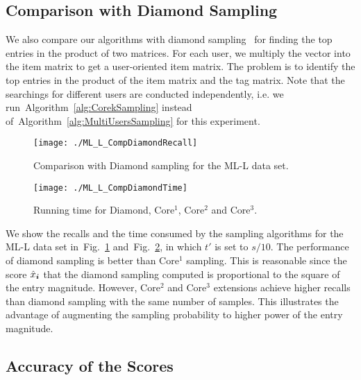 \documentclass[10pt,journal,compsoc]{IEEEtran}
\newcommand{\V}[1]{{\boldsymbol{{\MakeLowercase{#1}}}}}
\newcommand{\Fig}[1]{Fig.~\ref{fig:#1}}
\newcommand{\Alg}[1]{Algorithm~\ref{alg:#1}}
\begin{document}
\subsection{Comparison with Diamond Sampling}

We also compare our algorithms with diamond sampling~\cite{BaPiKoSe15} for finding the top entries in the product of two matrices. For each user, we multiply the vector into the item matrix to get a user-oriented item matrix. The problem is to identify the top entries in the product of the item matrix and the tag matrix. Note that the searchings for different users are conducted independently, i.e. we run~\Alg{CorekSampling} instead of~\Alg{MultiUsersSampling} for this experiment. 
\begin{figure}[!ht]
	\centering
	\texttt{[image: ./ML\_L\_CompDiamondRecall]}\\
	\caption{Comparison with Diamond sampling for the ML-L data set.}
	\label{fig:Comparison_recall}
\end{figure}

\begin{figure}[!ht]
	\centering
	\texttt{[image: ./ML\_L\_CompDiamondTime]}\\
	\caption{Running time for Diamond, Core$^1$, Core$^2$ and Core$^3$.}
	\label{fig:Comparison_time}
\end{figure}
We show the recalls and the time consumed by the sampling algorithms for the ML-L data set in~\Fig{Comparison_recall} and~\Fig{Comparison_time}, in which $t'$ is set to $s/10$. The performance of diamond sampling is better than Core$^1$ sampling. This is reasonable since the score $\hat{x}_{\V{i}}$ that the diamond sampling computed is proportional to the square of the entry magnitude. However, Core$^2$ and Core$^3$ extensions achieve higher recalls than diamond sampling with the same number of samples. This illustrates the advantage of augmenting the sampling probability to higher power of the entry magnitude.

\subsection{Accuracy of the Scores}
\end{document}

